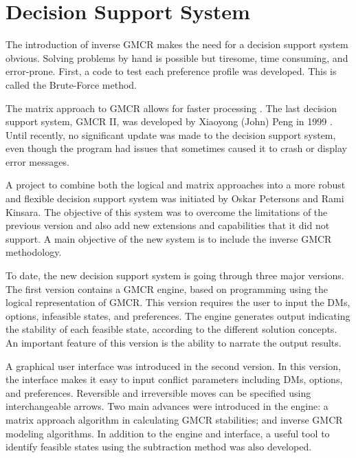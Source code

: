 \documentclass[letterpaper,12pt,titlepage,oneside,final]{book}
\begin{document}

\section{Decision Support System}

The introduction of inverse GMCR makes the need for a decision support system obvious. Solving problems by hand is possible but tiresome, time consuming, and error-prone. First, a code to test each preference profile was developed. This is called the Brute-Force method.

The matrix approach to GMCR allows for faster processing \cite{Xu2009Jr}. The last decision support system, GMCR II, was developed by Xiaoyong (John) Peng in 1999 \cite{peng1999decision}\cite{fang2003a}\cite{fang2003b}. Until recently, no significant update was made to the decision support system, even though the program had issues that sometimes caused it to crash or display error messages.

A project to combine both the logical and matrix approaches into a more robust and flexible decision support system was initiated by Oskar Petersons and Rami Kinsara. The objective of this system was to overcome the limitations of the previous version and also add new extensions and capabilities that it did not support. A main objective of the new system is to include the inverse GMCR methodology.

To date, the new decision support system is going through three major versions. The first version contains a GMCR engine, based on programming using the logical representation of GMCR. This version requires the user to input the DMs, options, infeasible states, and preferences. The engine generates output indicating the stability of each feasible state, according to the different solution concepts. An important feature of this version is the ability to narrate the output results. 

A graphical user interface was introduced in the second version. In this version, the interface makes it easy to input conflict parameters including DMs, options, and preferences. Reversible and irreversible moves can be specified using interchangeable arrows. Two main advances were introduced in the engine: a matrix approach algorithm in calculating GMCR stabilities; and inverse GMCR modeling algorithms. In addition to the engine and interface, a useful tool to identify feasible states using the subtraction method \cite{fraser1984} was also developed.
\end{document}

